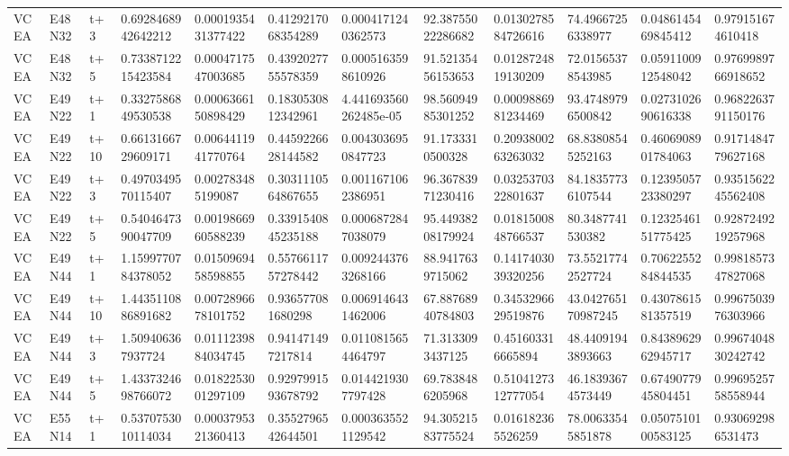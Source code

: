 \begin{landscape}
\begin{longtable}{llllllllllll}
VCEA & E48N32 & t+3 & 0.6928468942642212 & 0.0001935431377422 & 0.4129217068354289 & 0.0004171240362573 & 92.38755022286682 & 0.0130278584726616 & 74.49667256338977 & 0.0486145469845412 & 0.979151674610418 \\
VCEA & E48N32 & t+5 & 0.7338712215423584 & 0.0004717547003685 & 0.4392027755578359 & 0.0005163598610926 & 91.52135456153653 & 0.0128724819130209 & 72.01565378543985 & 0.0591100912548042 & 0.9769989766918652 \\
VCEA & E49N22 & t+1 & 0.3327586849530538 & 0.0006366150898429 & 0.1830530812342961 & 4.441693560262485e-05 & 98.56094985301252 & 0.0009886981234469 & 93.47489796500842 & 0.0273102690616338 & 0.9682263791150176 \\
VCEA & E49N22 & t+10 & 0.6613166729609171 & 0.0064411941770764 & 0.4459226628144582 & 0.0043036950847723 & 91.1733310500328 & 0.2093800263263032 & 68.83808545252163 & 0.4606908901784063 & 0.9171484779627168 \\
VCEA & E49N22 & t+3 & 0.4970349570115407 & 0.002783485199087 & 0.3031110564867655 & 0.0011671062386951 & 96.36783971230416 & 0.0325370322801637 & 84.18357736107544 & 0.1239505723380297 & 0.9351562245562408 \\
VCEA & E49N22 & t+5 & 0.5404647390047709 & 0.0019866960588239 & 0.3391540845235188 & 0.0006872847038079 & 95.44938208179924 & 0.0181500848766537 & 80.3487741530382 & 0.1232546151775425 & 0.9287249219257968 \\
VCEA & E49N44 & t+1 & 1.1599770784378052 & 0.0150969458598855 & 0.5576611757278442 & 0.0092443763268166 & 88.9417639715062 & 0.1417403039320256 & 73.55217742527724 & 0.7062255284844535 & 0.9981857347827068 \\
VCEA & E49N44 & t+10 & 1.4435110886891682 & 0.0072896678101752 & 0.936577081680298 & 0.0069146431462006 & 67.88768940784803 & 0.3453296629519876 & 43.042765170987245 & 0.4307861581357519 & 0.9967503976303966 \\
VCEA & E49N44 & t+3 & 1.509406367937724 & 0.0111239884034745 & 0.941471497217814 & 0.0110815654464797 & 71.3133093437125 & 0.451603316665894 & 48.44091943893663 & 0.8438962962945717 & 0.9967404830242742 \\
VCEA & E49N44 & t+5 & 1.4337324698766072 & 0.0182253001297109 & 0.9297991593678792 & 0.0144219307797428 & 69.7838486205968 & 0.5104127312777054 & 46.18393674573449 & 0.6749077945804451 & 0.9969525758558944 \\
VCEA & E55N14 & t+1 & 0.5370753010114034 & 0.0003795321360413 & 0.3552796542644501 & 0.0003635521129542 & 94.30521583775524 & 0.016182365526259 & 78.00633545851878 & 0.0507510100583125 & 0.930692986531473 \\

\end{longtable}
\end{landscape}
